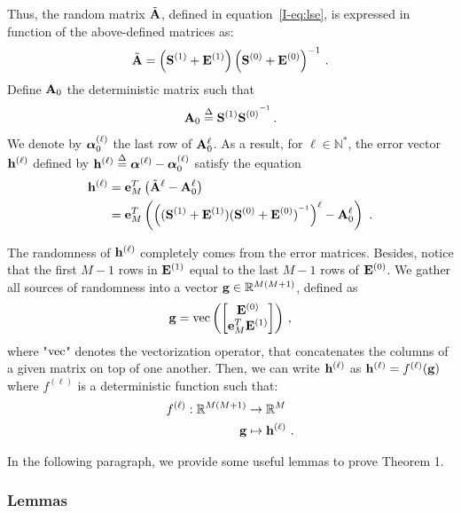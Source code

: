 \documentclass[journal,onecolumn]{IEEEtran}
\begin{document}
Thus, the random matrix $\tilde\bA$, defined in equation~\eqref{I-eq:lse}, is expressed in function of the above-defined matrices as:
\begin{equation*}
\tilde\bA = \left(\bS^{(1)}+\bE^{(1)}\right)\left(\bS^{(0)}+\bE^{(0)}\right)^{-1}\,.
\end{equation*}
Define $\bA_0$ the deterministic matrix such that
\begin{equation}
\bA_0 \defeq \bS^{(1)}{\bS^{(0)}}^\inv\,.
\label{eq:A0}
\end{equation}
We denote by $\balpha^{(\ell)}_0$ the last row of $\bA_0^\ell$. As a result, for $\ell\in \mathbb{N}^*$, the error vector $\bh^{(\ell)}$ defined by $\bh^{(\ell)}\defeq \balpha^{(\ell)} - \balpha^{(\ell)}_0$ satisfy the equation
\begin{align}
\nonumber
\bh^{(\ell)} &= \be_M^T\left(\tilde\bA^\ell-\bA_0^\ell\right) \\
&= \be_M^T\left(\left((\bS^{(1)}+\bE^{(1)})(\bS^{(0)}+\bE^{(0)})^\inv\right)^\ell- \bA_0^\ell\right)\ .
\label{eq:error.vec}
\end{align}

The randomness of $\bh^{(\ell)}$ completely comes from the error matrices. Besides, notice that the first $M-1$ rows in $\bE^{(1)}$ equal to the last $M-1$ rows of $\bE^{(0)}$. We gather all sources of randomness into a vector $\bg\in\RR^{M(M+1)}$, defined as
\begin{equation}
\bg = \vec\left(
\begin{bmatrix}
\bE^{(0)} \\
\be_M^T\bE^{(1)}
\end{bmatrix}
\right)\,,
\label{eq:vec}
\end{equation}
where "$\vec$" denotes the vectorization operator, that concatenates the columns of a given matrix on top of one another. Then, we can write $\bh^{(\ell)}$ as $\bh^{(\ell)}=f^{(\ell)}(\bg)$ where $f^{(\ell)}$ is a deterministic function such that:
\begin{align}
\nonumber
f^{(\ell)} : \RR^{M(M+1)} &\to \RR^{M} \\
 \bg &\mapsto \bh^{(\ell)}\ .
\label{eq:f.ell}
\end{align}

In the following paragraph, we provide some useful lemmas to prove Theorem 1.

\subsubsection{Lemmas}
\end{document}
